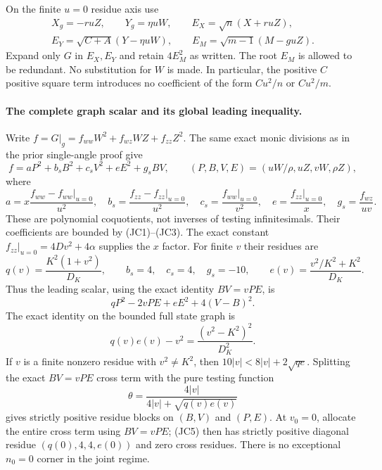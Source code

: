 On the finite $u=0$ residue axis use
\begin{gather*}
 X_g=-ruZ,\qquad Y_g=\eta uW,\qquad E_X=\sqrt n(X+ruZ),\\
 E_Y=\sqrt{C+A}(Y-\eta uW),\qquad
 E_M=\sqrt{m-1}(M-guZ).                              \tag{JC4}
\end{gather*}
Expand only $G$ in $E_X,E_Y$ and retain $4E_M^2$ as written.
The root $E_M$ is allowed to be redundant.  No substitution for
$W$ is made.  In particular, the positive $C$ positive square term introduces
no coefficient of the form $Cu^2/n$ or $Cu^2/m$.

\paragraph{The complete graph scalar and its global leading inequality.}
Write $f=G|_g=f_{ww}W^2+f_{wz}WZ+f_{zz}Z^2$.  The same exact monic
divisions as in the prior single-angle proof give
\[
 f=aP^2+b_sB^2+c_sV^2+eE^2+g_sBV,
 \qquad (P,B,V,E)=(uW/\rho,uZ,vW,\rho Z),              \tag{JC5}
\]
where
\[
 a=x\frac{f_{ww}-f_{ww}|_{u=0}}{u^2},\quad
 b_s=\frac{f_{zz}-f_{zz}|_{u=0}}{u^2},\quad
 c_s=\frac{f_{ww}|_{u=0}}{v^2},\quad
 e=\frac{f_{zz}|_{u=0}}x,\quad g_s=\frac{f_{wz}}{uv}.
\]
These are polynomial coquotients, not inverses of testing
infinitesimals.  Their coefficients are bounded by (JC1)--(JC3).
The exact constant $f_{zz}|_{u=0}=4Dv^2+4\alpha$ supplies the $x$
factor.  For finite $v$ their residues are
\[
 q(v)=\frac{K^2(1+v^2)}{D_K},\qquad
 b_s=4,\quad c_s=4,\quad g_s=-10,\qquad
 e(v)=\frac{v^2/K^2+K^2}{D_K}.                        \tag{JC6}
\]
Thus the leading scalar, using the exact identity $BV=vPE$, is
\[
                  qP^2-2vPE+eE^2+4(V-B)^2.           \tag{JC7}
\]
The exact identity on the bounded full state graph is
\[
                   q(v)e(v)-v^2
                    =\frac{(v^2-K^2)^2}{D_K^2}.      \tag{JC8}
\]
If $v$ is a finite nonzero residue with $v^2\ne K^2$, then
$10|v|<8|v|+2\sqrt{qe}$.  Splitting the exact $BV=vPE$ cross
term with the pure testing function
\[
             \theta=\frac{4|v|}{4|v|+\sqrt{q(v)e(v)}}
\]
gives strictly positive residue blocks on $(B,V)$ and $(P,E)$.
At $v_0=0$, allocate the entire cross term using $BV=vPE$;
(JC5) then has strictly positive diagonal residue
$(q(0),4,4,e(0))$ and zero cross residues.  There is no exceptional
$n_0=0$ corner in the joint regime.

